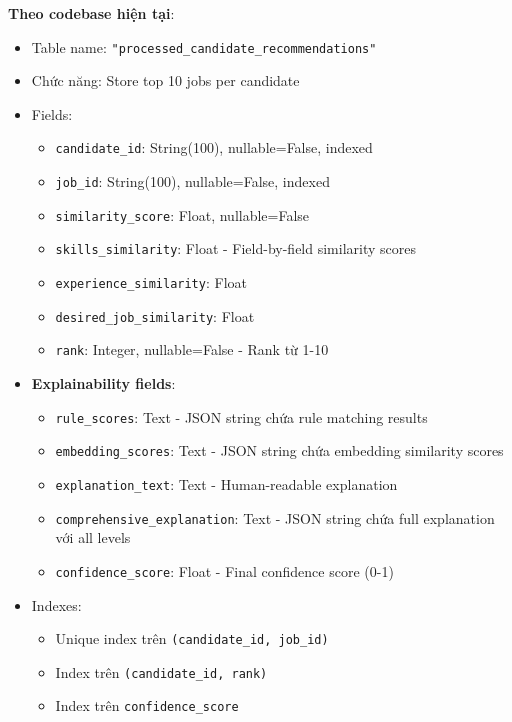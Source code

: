 \textbf{Theo codebase hiện tại}:
\begin{itemize}
    \item Table name: \texttt{"processed\_candidate\_recommendations"}
    \item Chức năng: Store top 10 jobs per candidate
    \item Fields:
    \begin{itemize}
        \item \texttt{candidate\_id}: String(100), nullable=False, indexed
        \item \texttt{job\_id}: String(100), nullable=False, indexed
        \item \texttt{similarity\_score}: Float, nullable=False
        \item \texttt{skills\_similarity}: Float - Field-by-field similarity scores
        \item \texttt{experience\_similarity}: Float
        \item \texttt{desired\_job\_similarity}: Float
        \item \texttt{rank}: Integer, nullable=False - Rank từ 1-10
    \end{itemize}
    \item \textbf{Explainability fields}:
    \begin{itemize}
        \item \texttt{rule\_scores}: Text - JSON string chứa rule matching results
        \item \texttt{embedding\_scores}: Text - JSON string chứa embedding similarity scores
        \item \texttt{explanation\_text}: Text - Human-readable explanation
        \item \texttt{comprehensive\_explanation}: Text - JSON string chứa full explanation với all levels
        \item \texttt{confidence\_score}: Float - Final confidence score (0-1)
    \end{itemize}
    \item Indexes:
    \begin{itemize}
        \item Unique index trên \texttt{(candidate\_id, job\_id)}
        \item Index trên \texttt{(candidate\_id, rank)}
        \item Index trên \texttt{confidence\_score}
    \end{itemize}
\end{itemize}

